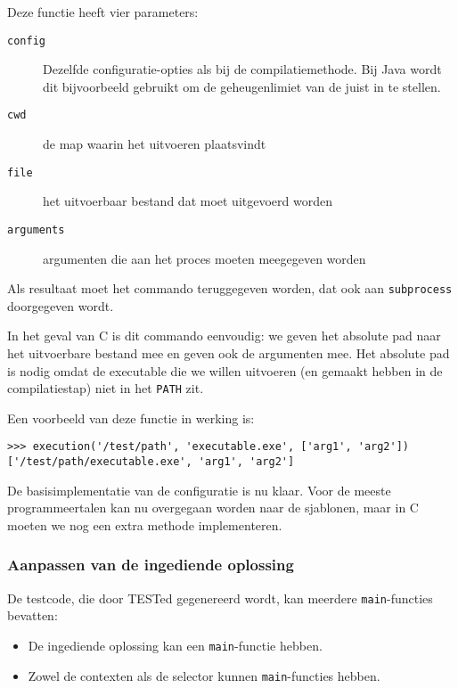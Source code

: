 \inputminted[firstline=19,lastline=22,gobble=4]{python}{sources/c-config.py}

Deze functie heeft vier parameters:

\begin{description}
    \item[\texttt{config}] Dezelfde configuratie-opties als bij de compilatiemethode. 
    Bij Java wordt dit bijvoorbeeld gebruikt om de geheugenlimiet van de  juist in te stellen.
    \item[\texttt{cwd}] de map waarin het uitvoeren plaatsvindt
    \item[\texttt{file}] het uitvoerbaar bestand dat moet uitgevoerd worden
    \item[\texttt{arguments}] argumenten die aan het proces moeten meegegeven worden
\end{description}

Als resultaat moet het commando teruggegeven worden, dat ook aan \texttt{subprocess} doorgegeven wordt.

In het geval van C is dit commando eenvoudig: we geven het absolute pad naar het uitvoerbare bestand mee en geven ook de argumenten mee.
Het absolute pad is nodig omdat de executable die we willen uitvoeren (en gemaakt hebben in de compilatiestap) niet in het \texttt{PATH} zit.

Een voorbeeld van deze functie in werking is:

\begin{verbatim}
>>> execution('/test/path', 'executable.exe', ['arg1', 'arg2'])
['/test/path/executable.exe', 'arg1', 'arg2']
\end{verbatim}

De basisimplementatie van de configuratie is nu klaar.
Voor de meeste programmeertalen kan nu overgegaan worden naar de sjablonen, maar in C moeten we nog een extra methode implementeren.

\subsubsection{Aanpassen van de ingediende oplossing}

De testcode, die door TESTed gegenereerd wordt, kan meerdere \texttt{main}-functies bevatten:

\begin{itemize}
    \item De ingediende oplossing kan een \texttt{main}-functie hebben.
    \item Zowel de contexten als de selector kunnen \texttt{main}-functies hebben.
\end{itemize}


